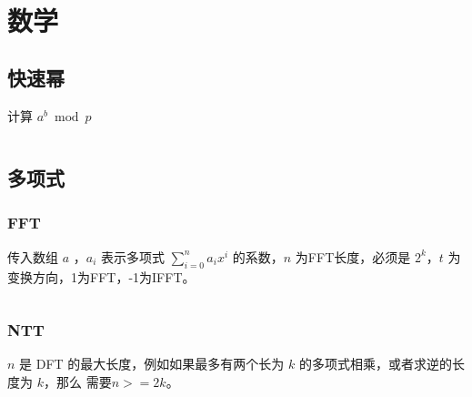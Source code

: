 \documentclass[a4paper, twoside]{article}
\title{\vspace{20cm}\fontsize{50pt}{20pt}\selectfont{Standard Code Library}\\\fontsize{24pt}{\baselineskip}\selectfont{}\vspace{0.1cm}}
\author{\fontsize{15pt}{\baselineskip}\selectfont{XXX University}\vspace{0.2cm}\\\fontsize{12pt}{\baselineskip}\selectfont{WSFcloud}}
\date{}
\begin{document}
\begin{titlepage}
    \selectfont{\color{black}{\maketitle}}
	\thispagestyle{empty}
	\afterpage{\null\thispagestyle{empty}\newpage} %
\end{titlepage}

\pagestyle{plain}
\setcounter{page}{1}
\renewcommand{\contentsname}{\Huge \textbf{目录}}           %
\renewcommand{\cftsecdotsep}{4}                             %
\renewcommand{\cftsubsecdotsep}{4}                          %
\renewcommand{\cftsecfont}{\large\bfseries}                 %
\begin{center}
    \tableofcontents         
\end{center}
\ifodd\value{page}
    \afterpage{\null\thispagestyle{empty}\newpage}          %
\fi

\newpage
\pagestyle{fancy}
\setcounter{page}{1}
\section{数学}
\subsection{快速幂}
计算 $a^b \bmod p$
\inputminted{cpp}{../src/数学/快速幂.cpp}
\subsection{多项式}
    \subsubsection{FFT}
    传入数组 $a$ ，$a_i$ 表示多项式 $\sum\limits_{i=0}^{n} a_ix^i$ 的系数，$n$ 为FFT长度，必须是 $2^k$，$t$ 为变换方向，1为FFT，-1为IFFT。
    \inputminted{cpp}{../src/数学/FFT.cpp}
    
    \subsubsection{NTT}
    $n$ 是 DFT 的最大长度，例如如果最多有两个长为 $k$ 的多项式相乘，或者求逆的长度为 $k$，那么 需要$n >= 2k$。
    \inputminted{cpp}{../src/数学/NTT.cpp}
\end{document}
